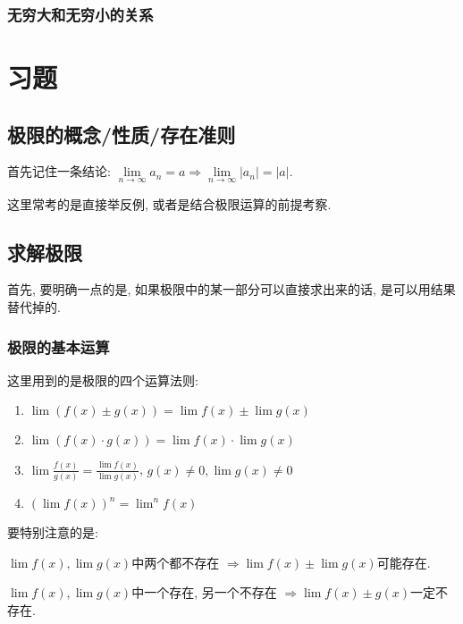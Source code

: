 \subsubsection{无穷大和无穷小的关系}
\section{习题}
\subsection{极限的概念/性质/存在准则}
首先记住一条结论: $ \lim\limits_{n \rightarrow \infty}a_{n}=a\Rightarrow \lim\limits_{n \rightarrow \infty}|a_{n}|=|a| $.\par
这里常考的是直接举反例, 或者是结合极限运算的前提考察.
\subsection{求解极限}
首先, 要明确一点的是, 如果极限中的某一部分可以直接求出来的话, 是可以用结果替代掉的.
\subsubsection{极限的基本运算}
这里用到的是极限的四个运算法则:
\begin{enumerate}
    \item $ \lim\limits (f(x)\pm g(x))=\lim\limits f(x)\pm \lim\limits g(x) $
    \item $ \lim\limits (f(x)\cdot g(x))=\lim\limits f(x)\cdot \lim\limits g(x) $
    \item $ \lim\limits \frac{f(x)}{g(x)}=\frac{\lim\limits f(x)}{\lim\limits g(x)} $, $ g(x)\neq 0, \lim\limits g(x)\neq 0 $
    \item $ (\lim\limits f(x))^{n}={\lim\limits}^{n}f(x) $
\end{enumerate}\par
\begin{tcolorbox}
    要特别注意的是:\par
    $ \lim\limits f(x), \lim\limits g(x) $中两个都不存在 $ \Rightarrow\lim\limits f(x)\pm \lim\limits g(x) $可能存在.\par
    $ \lim\limits f(x), \lim\limits g(x) $中一个存在, 另一个不存在 $ \Rightarrow \lim\limits f(x)\pm g(x) $一定不存在.
\end{tcolorbox}
